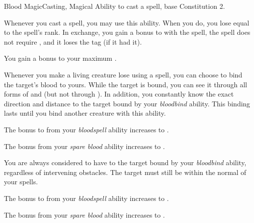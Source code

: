     \begin{feat}{Blood Magic}{Casting, Magical}
        \featpre Ability to cast a spell, base Constitution 2.

         Whenever you cast a spell, you may use this ability.
        When you do, you lose  equal to the spell's rank.
        In exchange, you gain a  bonus to  with the spell, the spell does not require , and it loses the  tag (if it had it).

         You gain a  bonus to your maximum .

         Whenever you make a living creature lose  using a spell, you can choose to bind the target's blood to yours.
        While the target is bound, you can see it through all forms of  and  (but not through ).
        In addition, you constantly know the exact direction and distance to the target bound by your \textit{bloodbind} ability.
        This binding lasts until you bind another creature with this ability.

         The bonus to  from your \textit{bloodspell} ability increases to .

         The bonus from your \textit{spare blood} ability increases to .

         You are always considered to have  to the target bound by your \textit{bloodbind} ability, regardless of intervening obstacles.
        The target must still be within the normal  of your spells.

         The bonus to  from your \textit{bloodspell} ability increases to .

         The bonus from your \textit{spare blood} ability increases to .
    \end{feat}


